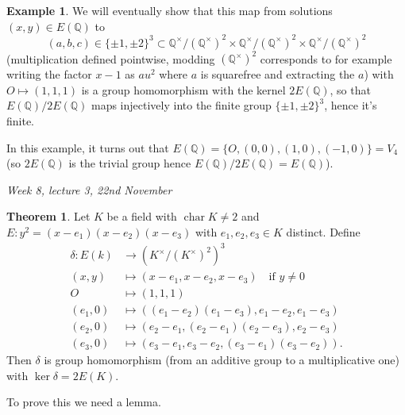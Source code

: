 \documentclass{article}
\newcommand{\Q}{\mathbb{Q}}
\newcommand{\Char}{\operatorname{char}}
\theoremstyle{definition}
\newtheorem{thm}[defn]{Theorem}
\newtheorem{example}[defn]{Example}
\begin{document}
\begin{example}
We will eventually show that this map from solutions $(x,y)\in E(\Q)$ to
\[
(a,b,c)\in\{\pm 1,\pm 2\}^3\subset \Q^\times/(\Q^\times)^2\times \Q^\times/(\Q^\times)^2\times \Q^\times/(\Q^\times)^2
\]
(multiplication defined pointwise, modding $(\Q^\times)^2$ corresponds to for example writing the factor $x-1$ as $au^2$ where $a$ is squarefree and extracting the $a$) with $O\mapsto (1,1,1)$ is a group homomorphism with the kernel $2E(\Q)$, so that $E(\Q)/2E(\Q)$ maps injectively into the finite group $\{\pm 1,\pm 2\}^3$, hence it's finite.

In this example, it turns out that $E(\Q)=\{O,(0,0),(1,0),(-1,0)\}=V_4$ (so $2E(\Q)$ is the trivial group hence $E(\Q)/2E(\Q)=E(\Q)$).
\end{example}

\begin{flushright}
\textit{Week 8, lecture 3, 22nd November}
\end{flushright}

\begin{thm}
\label{thm:deltahom}
Let $K$ be a field with $\Char K\neq 2$ and $E:y^2=(x-e_1)(x-e_2)(x-e_3)$ with $e_1,e_2,e_3\in K$ distinct. Define
\[
\begin{aligned}
\delta:E(k)&\rightarrow \left(K^\times/(K^\times)^2\right)^3 \\
(x,y)&\mapsto (x-e_1,x-e_2,x-e_3)\quad \text{if }y\neq 0 \\
O&\mapsto (1,1,1) \\
(e_1,0)&\mapsto ((e_1-e_2)(e_1-e_3),e_1-e_2,e_1-e_3) \\
(e_2,0)&\mapsto (e_2-e_1,(e_2-e_1)(e_2-e_3),e_2-e_3) \\
(e_3,0)&\mapsto (e_3-e_1,e_3-e_2,(e_3-e_1)(e_3-e_2)).
\end{aligned}
\]
Then $\delta$ is group homomorphism (from an additive group to a multiplicative one) with $\ker\delta=2E(K)$.
\end{thm}

To prove this we need a lemma.
\end{document}

